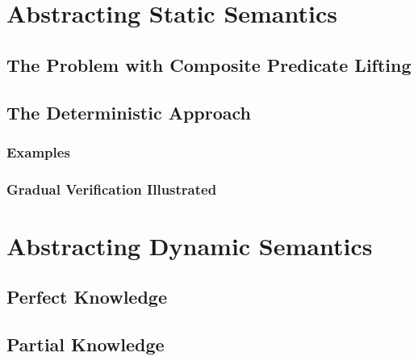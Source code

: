 \section{Abstracting Static Semantics}
\label{sec:abstracting-static-semantics}

    
    \subsection{The Problem with Composite Predicate Lifting}
    \label{ssec:the-problem-with}
    
    
    \subsection{The Deterministic Approach}
    \label{ssec:the-deterministic-approach}
    
    
        \subsubsection{Examples}
        \label{sssec:examples-lift-determ}
        
        
        \subsubsection{Gradual Verification Illustrated}
        \label{sssec:gradual-verification-illustrated}
        

\section{Abstracting Dynamic Semantics}
\label{sec:abstracting-dynamic-semantics}


    \subsection{Perfect Knowledge}
    \label{ssec:perfect-knowledge}
    
    
    \subsection{Partial Knowledge}
    \label{ssec:atomic--knowledge}
    




